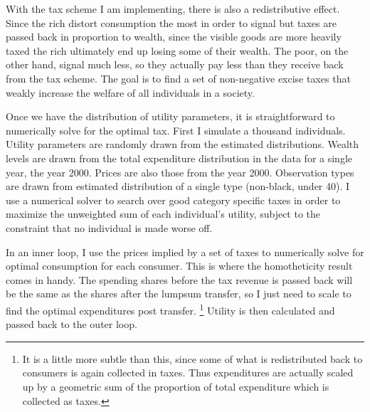 \documentclass[12pt]{article}
\begin{document}
With the tax scheme I am implementing, there is also a redistributive effect.
Since the rich distort consumption the most in order to signal but taxes are passed back in proportion to wealth, since the visible goods are more heavily taxed the rich ultimately end up losing some of their wealth.
The poor, on the other hand, signal much less, so they actually pay less than they receive back from the tax scheme.  
The goal is to find a set of non-negative excise taxes that weakly increase the welfare of all individuals in a society.

Once we have the distribution of utility parameters, it is straightforward to numerically solve for the optimal tax.
First I simulate a thousand individuals.
Utility parameters are randomly drawn from the estimated distributions.
Wealth levels are drawn from the total expenditure distribution in the data for a single year, the year 2000.
Prices are also those from the year 2000.
Observation types are drawn from estimated distribution of a single type (non-black, under 40).
I use a numerical solver to search over good category specific taxes in order to maximize the unweighted sum of each individual's utility, subject to the constraint that no individual is made worse off.

In an inner loop, I use the prices implied by a set of taxes to numerically solve for optimal consumption for each consumer.
This is where the homotheticity result comes in handy. The spending shares before the tax revenue is passed back will be the same as the shares after the lumpsum transfer, so I just need to scale to find the optimal expenditures post transfer. 
\footnote{It is a little more subtle than this, since some of what is redistributed back to consumers is again collected in taxes.
    Thus expenditures are actually scaled up by a geometric sum of the proportion of total expenditure which is collected as taxes. 
}
Utility is then calculated and passed back to the outer loop.
\end{document}
